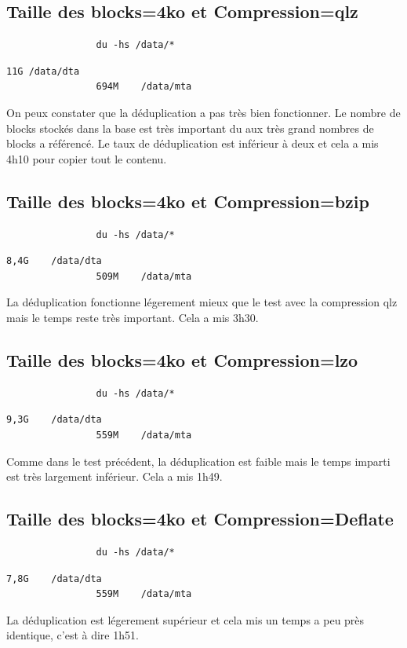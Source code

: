 \documentclass[a4paper]{report}
\begin{document}
		\subsection{Taille des blocks=4ko et Compression=qlz}
			\begin{lstlisting}
				du -hs /data/*
			\end{lstlisting}
			\begin{lstlisting}[backgroundcolor=\color{yellow}]
				11G	/data/dta
				694M	/data/mta
			\end{lstlisting}
			On peux constater que la déduplication a pas très bien fonctionner. Le nombre de blocks stockés dans la base est très important du aux très grand nombres de blocks a référencé. Le taux de déduplication est inférieur à deux et cela a mis 4h10 pour copier tout le contenu.\\

		\subsection{Taille des blocks=4ko et Compression=bzip}
			\begin{lstlisting}
				du -hs /data/*
			\end{lstlisting}
			\begin{lstlisting}[backgroundcolor=\color{yellow}]
				8,4G	/data/dta
				509M	/data/mta
			\end{lstlisting}
			La déduplication fonctionne légerement mieux que le test avec la compression qlz mais le temps reste très important. Cela a mis 3h30.
		\subsection{Taille des blocks=4ko et Compression=lzo}
			\begin{lstlisting}
				du -hs /data/*
			\end{lstlisting}
			\begin{lstlisting}[backgroundcolor=\color{yellow}]
				9,3G	/data/dta
				559M	/data/mta
			\end{lstlisting}
			Comme dans le test précédent, la déduplication est faible mais le temps imparti est très largement inférieur. Cela a mis 1h49.
		\subsection{Taille des blocks=4ko et Compression=Deflate}
			\begin{lstlisting}
				du -hs /data/*
			\end{lstlisting}
			\begin{lstlisting}[backgroundcolor=\color{yellow}]
				7,8G	/data/dta
				559M	/data/mta
			\end{lstlisting}
			La déduplication est légerement supérieur et cela mis un temps a peu près identique, c'est à dire 1h51.
\end{document}
